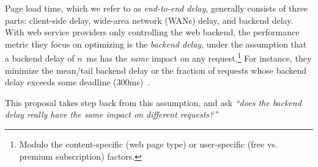 Page load time, which we refer to as {\em end-to-end delay}, generally consists of three parts: client-side delay, wide-area network (WANs) delay, and backend delay.
With web service providers only controlling the web backend, the performance metric they focus on optimizing is the 
{\em backend delay}, under the assumption that a backend delay of $n$~ms has the {\em same} impact on any request.\footnote{Modulo the content-specific (\eg web page type) or user-specific (\eg free vs. premium subscription) factors.}
For instance, they minimize the mean/tail backend delay or the fraction of requests whose backend delay exceeds some deadline (\eg 300ms)~\cite{??,??}.

This proposal takes step back from this assumption, and ask {\em ``does the backend delay really have the same impact on different requests?''}


